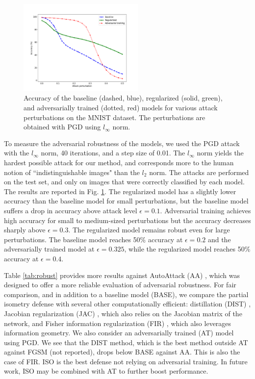 \documentclass[entropy,article,submit,pdftex,moreauthors]{Definitions/mdpi}
\theoremstyle{plain}
\theoremstyle{definition}
\begin{document}
\begin{figure}[tb]
  \centering
  \centerline{\includegraphics[width=0.55\textwidth]{figures/iso_8_vanilla_2_adv_train_pgd.png}}
  \caption{Accuracy of the baseline (dashed, blue), regularized (solid, green), and adversarially trained (dotted, red) models for various attack perturbations on the MNIST dataset. The perturbations are obtained with PGD using $l_\infty$ norm.}
  \label{fig:pgd}
%
\end{figure}



To measure the adversarial robustness of the models, we used the PGD attack with the $l_\infty$ norm, 40 iterations, and a step size of 0.01. The $l_\infty$ norm yields the hardest possible attack for our method, and corresponds more to the human notion of ``indistinguishable images" than the $l_2$ norm. The attacks are performed on the test set, and only on images that were correctly classified by each model. The results are reported in Fig. \ref{fig:pgd}. The regularized model has a slightly lower accuracy than the baseline model for small perturbations, but the baseline model suffers a drop in accuracy above attack level $\epsilon = 0.1$. Adversarial training achieves high accuracy for small to medium-sized perturbations but the accuracy decreases sharply above $\epsilon=0.3$. The regularized model remains robust even for large perturbations. The baseline model reaches 50\% accuracy at $\epsilon=0.2$ and the adversarially trained model at $\epsilon=0.325$, while the regularized model reaches 50\% accuracy at $\epsilon=0.4$.

Table \ref{tab:robust} provides more results against AutoAttack (AA) \citep{croceReliableEvaluationAdversarial2020}, which was designed to offer a more reliable evaluation of adversarial robustness. For fair comparison, and in addition to a baseline model (BASE), we compare the partial isometry defense with several other computationally efficient: distillation (DIST) \citep{papernotDistillationDefenseAdversarial2016}, Jacobian regularization (JAC) \citep{hoffmanRobustLearningJacobian2019}, which also relies on the Jacobian matrix of the network, and Fisher information regularization (FIR) \citep{shenDefendingAdversarialAttacks2019}, which also leverages information geometry. We also consider an adversarially trained (AT) model using PGD. We see that the DIST method, which is the best method outside AT against FGSM (not reported), drops below BASE against AA. This is also the case of FIR. ISO is the best defense not relying on adversarial training. In future work, ISO may be combined with AT to further boost performance.
\end{document}
